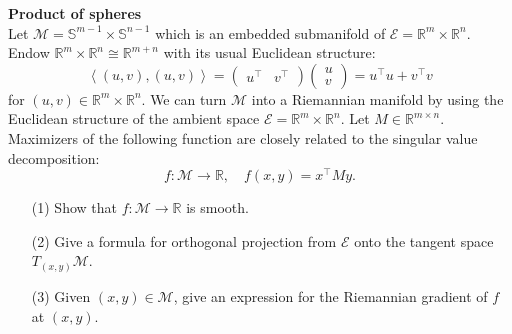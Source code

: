 \documentclass[en, oneside]{assignment}
\begin{document}
\begin{prob} \textbf{Product of spheres}\\
    Let $\mathcal{M} = \mathbb{S}^{m-1} \times \mathbb{S}^{n-1}$ which is an embedded submanifold of $\mathcal{E} = \mathbb{R}^{m} \times \mathbb{R}^{n}$.
    Endow $\mathbb{R}^{m} \times \mathbb{R}^{n} \cong \mathbb{R}^{m+n}$ with its usual Euclidean structure:
    \begin{equation*}
        \left\langle (u, v), (u, v) \right\rangle = \begin{pmatrix} u^{\top} & v^{\top} \end{pmatrix} \begin{pmatrix} u \\ v \end{pmatrix} = u^{\top} u + v^{\top} v
    \end{equation*}
    for $(u, v) \in \mathbb{R}^{m} \times \mathbb{R}^{n}$. 
    We can turn $\mathcal{M}$ into a Riemannian manifold by using the Euclidean structure of the ambient space $\mathcal{E} = \mathbb{R}^{m} \times \mathbb{R}^{n}$.
    Let $M \in \mathbb{R}^{m \times n}$. Maximizers of the following function are closely related to the singular value decomposition:
    \begin{equation*}
        f: \mathcal{M} \rightarrow \mathbb{R}, \quad f(x, y) = x^{\top} M y.
    \end{equation*}
    \begin{itemize}
        \item[(1)] Show that $f: \mathcal{M} \rightarrow \mathbb{R}$ is smooth.
        \item[(2)] Give a formula for orthogonal projection from $\mathcal{E}$ onto the tangent space $T_{(x, y)}\mathcal{M}$.
        \item[(3)] Given $(x, y) \in \mathcal{M}$, give an expression for the Riemannian gradient of $f$ at $(x, y)$.
    \end{itemize}
\end{prob}
\end{document}
